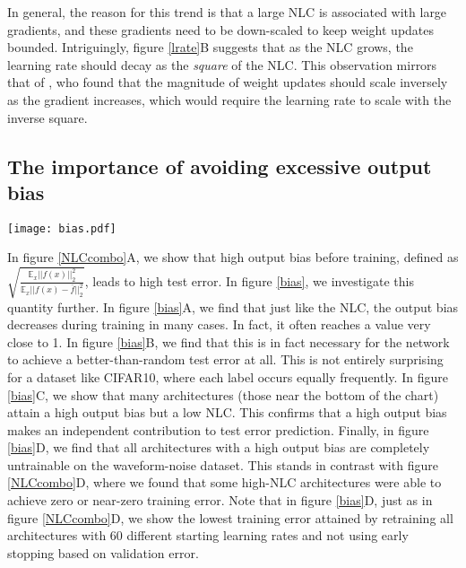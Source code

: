 \documentclass{article} %
\begin{document}
In general, the reason for this trend is that a large NLC is associated with large gradients, and these gradients need to be down-scaled to keep weight updates bounded. Intriguingly, figure \ref{lrate}B suggests that as the NLC grows, the learning rate should decay as the {\it square} of the NLC. This observation mirrors that of \citet{expl}, who found that the magnitude of weight updates should scale inversely as the gradient increases, which would require the learning rate to scale with the inverse square.


\subsection{The importance of avoiding excessive output bias} \label{biasSection}

\begin{figure*}
\texttt{[image: bias.pdf]}
\caption{Detailed results from our empirical study. See main text for explanation and section \ref{nlcTestDetails} for further details. All output bias and NLC values are computed on the training set.}\label{bias}
\end{figure*}

In figure \ref{NLCcombo}A, we show that high output bias before training, defined as $\sqrt{\frac{\mathbb{E}_x||f(x)||_2^2}{\mathbb{E}_x||f(x)-\bar{f}||_2^2}}$, leads to high test error. In figure \ref{bias}, we investigate this quantity further. In figure \ref{bias}A, we find that just like the NLC, the output bias decreases during training in many cases. In fact, it often reaches a value very close to 1. In figure \ref{bias}B, we find that this is in fact necessary for the network to achieve a better-than-random test error at all. This is not entirely surprising for a dataset like CIFAR10, where each label occurs equally frequently. In figure \ref{bias}C, we show that many architectures (those near the bottom of the chart) attain a high output bias but a low NLC. This confirms that a high output bias makes an independent contribution to test error prediction. Finally, in figure \ref{bias}D, we find that all architectures with a high output bias are completely untrainable on the waveform-noise dataset. This stands in contrast with figure \ref{NLCcombo}D, where we found that some high-NLC architectures were able to achieve zero or near-zero training error. Note that in figure \ref{bias}D, just as in figure \ref{NLCcombo}D, we show the lowest training error attained by retraining all architectures with 60 different starting learning rates and not using early stopping based on validation error.
\end{document}
